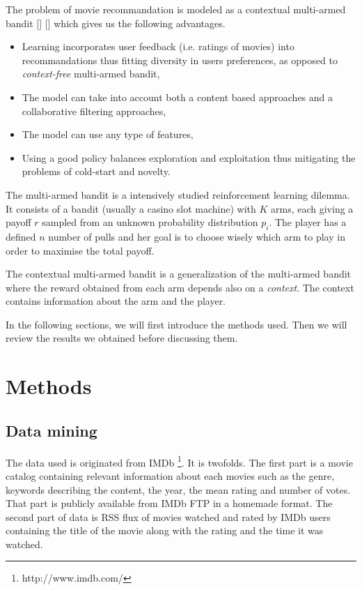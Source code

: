 \documentclass[letterpaper]{article}
\begin{document}
The problem of movie recommandation is modeled as a contextual multi-armed bandit [\cite{sutton1998reinforcement}] [\cite{lu2010contextual}] which gives us the following advantages.

\begin{itemize}
	\item Learning incorporates user feedback (i.e. ratings of movies) into recommandations thus fitting diversity in users preferences, as opposed to \textit{context-free} multi-armed bandit,
	\item The model can take into account both a content based approaches and a collaborative filtering approaches,
	\item The model can use any type of features,
	\item Using a good policy balances exploration and exploitation thus mitigating the problems of cold-start and novelty.
\end{itemize}

The multi-armed bandit is a intensively studied reinforcement learning dilemma. It consists of a bandit (usually a casino slot machine) with $K$ arms, each giving a payoff $r$ sampled from an unknown probability distribution $p_{i}$. The player has a defined $n$ number of pulls and her goal is to choose wisely which arm to play in order to maximise the total payoff.

The contextual multi-armed bandit is a generalization of the multi-armed bandit where the reward obtained from each arm depends also on a \textit{context}. The context contains information about the arm and the player.


In the following sections, we will first introduce the methods used. Then we will review the results we obtained before discussing them.

\section{Methods}

\subsection{Data mining}

The data used is originated from IMDb \footnote{http://www.imdb.com/}. It is twofolds. The first part is a movie catalog containing relevant information about each movies such as the genre, keywords describing the content, the year, the mean rating and number of votes. That part is publicly available from IMDb FTP in a homemade format. The second part of data is RSS flux of movies watched and rated by IMDb users containing the title of the movie along with the rating and the time it was watched.
\end{document}
